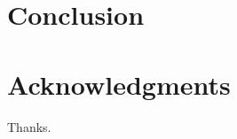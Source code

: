 \documentclass{ws-jai}
\begin{document}
%
%
%
%
%

\section{Conclusion}
\label{sec:conclusion}
\section*{Acknowledgments}
Thanks.


\end{document}
